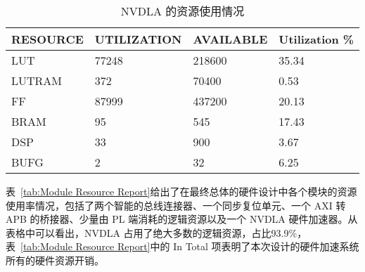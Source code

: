 \begin{table}[!htbp]
    \caption{NVDLA 的资源使用情况}
    \label{tab:Resource Report}
    \centering
    \footnotesize%
    \setlength{\tabcolsep}{4pt}%
    \renewcommand{\arraystretch}{1.2}%
    \begin{tabular}{llll}
        \toprule
        \textbf{RESOURCE} & \textbf{UTILIZATION} & \textbf{AVAILABLE} & \textbf{Utilization \%} \\
        \midrule
        LUT               & 77248                & 218600               & 35.34                   \\
        LUTRAM            & 372                  & 70400                & 0.53                    \\
        FF                & 87999                & 437200               & 20.13                   \\
        BRAM              & 95                   & 545                  & 17.43                   \\
        DSP               & 33                   & 900                  & 3.67                    \\
        BUFG              & 2                    & 32                   & 6.25                    \\
        \bottomrule                   
    \end{tabular}
\end{table}

表~\ref{tab:Module Resource Report}给出了在最终总体的硬件设计中各个模块的资源使用率情况，包括了两个智能的总线连接器、一个同步复位单元、一个 AXI 转 APB 的桥接器、少量由 PL 端消耗的逻辑资源以及一个 NVDLA 硬件加速器。从表格中可以看出，NVDLA 占用了绝大多数的逻辑资源，占比93.9\%，表~\ref{tab:Module Resource Report}中的 In Total 项表明了本次设计的硬件加速系统所有的硬件资源开销。

